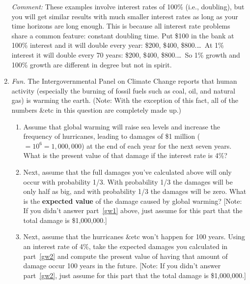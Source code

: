 \begin{enumerate}
\emph{Comment:} These examples involve interest rates of 100\% (i.e., doubling), but you will get similar results with much smaller interest rates as long as your time horizons are long enough. This is because all interest rate problems share a common feature: constant doubling time. Put \$100 in the bank at 100\% interest and it will double every year: \$200, \$400, \$800.\ldots\ At 1\% interest it will double every 70 years: \$200, \$400, \$800.\ldots\ So 1\% growth and 100\% growth are different in degree but not in spirit.













\item \emph{Fun.} The Intergovernmental Panel on Climate Change reports that human activity (especially the burning of fossil fuels such as coal, oil, and natural gas) is warming the earth. (Note: With the exception of this fact, all of the numbers \&etc in this question are completely made up.)

    \begin{enumerate}

    \item \label{gw1} Assume that global warming will raise sea levels and increase the frequency of hurricanes, leading to damages of \$1 million ($=10^6=1,000,000$) at the end of each year for the next seven years. What is the present value of that damage if the interest rate is 4\%?


    \item \label{gw2} Next, assume that the full damages you've calculated above will only occur with probability 1/3. With probability 1/3 the damages will be only half as big, and with probability 1/3 the damages will be zero. What is the \textbf{expected value} of the damage caused by global warming? [Note: If you didn't answer part~\ref{gw1} above, just assume for this part that the total damage is \$1,000,000.] 


    \item Next, assume that the hurricanes \&etc won't happen for 100 years. Using an interest rate of 4\%, take the expected damages you calculated in part~\ref{gw2} and compute the present value of having that amount of damage occur 100 years in the future. [Note: If you didn't answer part~\ref{gw2}, just assume for this part that the total damage is \$1,000,000.]



\end{enumerate}
\end{enumerate}
